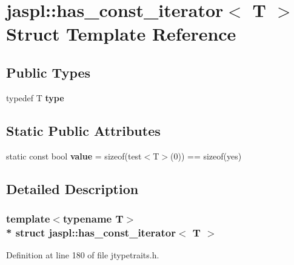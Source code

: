 \hypertarget{structjaspl_1_1has__const__iterator}{}\section{jaspl\+:\+:has\+\_\+const\+\_\+iterator$<$ T $>$ Struct Template Reference}
\label{structjaspl_1_1has__const__iterator}
\subsection*{Public Types}
\begin{DoxyCompactItemize}
\item 
typedef T {\bfseries type}\hypertarget{structjaspl_1_1has__const__iterator_a90b87335124f7b6bdf7087340deb9d98}{}\label{structjaspl_1_1has__const__iterator_a90b87335124f7b6bdf7087340deb9d98}

\end{DoxyCompactItemize}
\subsection*{Static Public Attributes}
\begin{DoxyCompactItemize}
\item 
static const bool {\bfseries value} = sizeof(test$<$T$>$(0)) == sizeof(yes)\hypertarget{structjaspl_1_1has__const__iterator_aafd1712c16d8f6cccec39c5c27f0b3d3}{}\label{structjaspl_1_1has__const__iterator_aafd1712c16d8f6cccec39c5c27f0b3d3}

\end{DoxyCompactItemize}


\subsection{Detailed Description}
\subsubsection*{template$<$typename T$>$\\*
struct jaspl\+::has\+\_\+const\+\_\+iterator$<$ T $>$}



Definition at line 180 of file jtypetraits.\+h.

